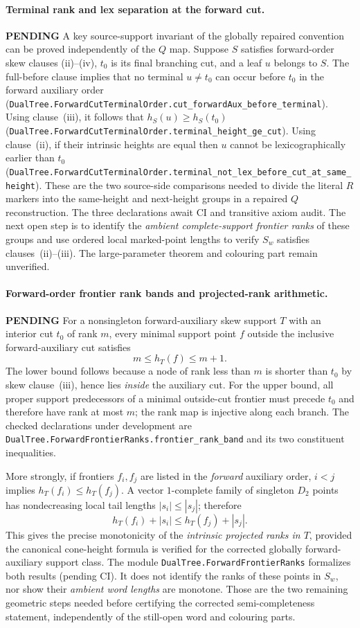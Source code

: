 \documentclass[11pt]{article}
\newcommand{\todo}{\textcolor{gray!70!black}{\textbf{PENDING}}}
\newcommand{\lean}[1]{\texttt{#1}}
\begin{document}
\paragraph{Terminal rank and lex separation at the forward cut.} \todo
A key source-support invariant of the globally repaired
convention can be proved independently of the $Q$ map.
Suppose $S$ satisfies forward-order skew clauses
(ii)--(iv), $t_0$ is its final branching cut,
and a leaf $u$ belongs to $S$.
The full-before clause implies that no terminal
$u\ne t_0$ can occur before $t_0$ in the
forward auxiliary order
(\lean{DualTree.ForwardCutTerminalOrder.cut_forwardAux_before_terminal}).
Using clause~(iii), it follows that
$h_S(u)\ge h_S(t_0)$
(\lean{DualTree.ForwardCutTerminalOrder.terminal_height_ge_cut}).
Using clause~(ii), if their intrinsic heights
are equal then $u$ cannot be lexicographically
earlier than $t_0$
(\lean{DualTree.ForwardCutTerminalOrder.terminal_not_lex_before_cut_at_same_height}).
These are the two source-side comparisons needed
to divide the literal $R$ markers into the
same-height and next-height groups in a repaired
$Q$ reconstruction. The three declarations await
CI and transitive axiom audit. The next open
step is to identify the \emph{ambient complete-support
frontier ranks} of these groups and use ordered
local marked-point lengths to verify $S_w$
satisfies clauses~(ii)--(iii).
The large-parameter theorem and colouring part
remain unverified.

\paragraph{Forward-order frontier rank bands and projected-rank arithmetic.} \todo
For a nonsingleton forward-auxiliary skew support
$T$ with an interior cut $t_0$ of rank $m$,
every minimal support point $f$ outside the
inclusive forward-auxiliary cut satisfies
\[
 m\le h_T(f)\le m+1.
\]
The lower bound follows because a node of rank
less than $m$ is shorter than $t_0$ by skew
clause~(iii), hence lies \emph{inside} the auxiliary
cut. For the upper bound, all proper support
predecessors of a minimal outside-cut frontier
must precede $t_0$ and therefore have rank at
most $m$; the rank map is injective along each
branch. The checked declarations under development
are \lean{DualTree.ForwardFrontierRanks.frontier_rank_band}
and its two constituent inequalities.

More strongly, if frontiers $f_i,f_j$ are
listed in the \emph{forward} auxiliary order,
$i<j$ implies $h_T(f_i)\le h_T(f_j)$.
A vector $1$-complete family of singleton
$D_2$ points has nondecreasing local tail lengths
$|s_i|\le |s_j|$; therefore
\[
 h_T(f_i)+|s_i|
 \le h_T(f_j)+|s_j|.
\]
This gives the precise monotonicity of the
\emph{intrinsic projected ranks in $T$}, provided
the canonical cone-height formula is verified
for the corrected globally forward-auxiliary
support class. The module
\lean{DualTree.ForwardFrontierRanks}
formalizes both results (pending CI).
It does not identify the ranks of these
points in $S_w$, nor show their
\emph{ambient word lengths} are monotone.
Those are the two remaining geometric steps
needed before certifying the corrected
semi-completeness statement, independently
of the still-open word and colouring parts.
\end{document}

